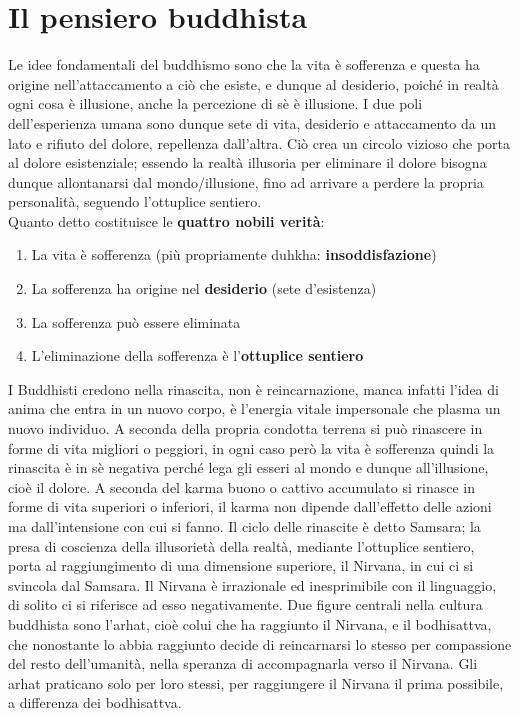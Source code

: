 \documentclass[10pt,a4paper]{report}
\begin{document}
\section{Il pensiero buddhista}
Le idee fondamentali del buddhismo sono che la vita è sofferenza e questa ha origine nell'attaccamento a ciò che esiste, e dunque al desiderio, poiché in realtà ogni cosa è illusione, anche la percezione di sè è illusione. I due poli dell'esperienza umana sono dunque sete di vita, desiderio e attaccamento da un lato e rifiuto del dolore, repellenza dall'altra. Ciò crea un circolo vizioso che porta al dolore esistenziale; essendo la realtà illusoria per eliminare il dolore bisogna dunque allontanarsi dal mondo/illusione, fino ad arrivare a perdere la propria personalità, seguendo l'ottuplice sentiero.\\
Quanto detto costituisce le \textbf{quattro nobili verità}:
\begin{enumerate}
	\item La vita è sofferenza (più propriamente duhkha: \textbf{insoddisfazione})
	\item La sofferenza ha origine nel \textbf{desiderio} (sete d'esistenza)
	\item La sofferenza può essere eliminata
	\item L'eliminazione della sofferenza è l'\textbf{ottuplice sentiero}
\end{enumerate}
I Buddhisti credono nella rinascita, non è reincarnazione, manca infatti l'idea di anima che entra in un nuovo corpo, è l'energia vitale impersonale che plasma un nuovo individuo. A seconda della propria condotta terrena si può rinascere in forme di vita migliori o peggiori, in ogni caso però la vita è sofferenza quindi la rinascita è in sè negativa perché lega gli esseri al mondo e dunque all'illusione, cioè il dolore. A seconda del karma buono o cattivo accumulato si rinasce in forme di vita superiori o inferiori, il karma non dipende dall'effetto delle azioni ma dall'intensione con cui si fanno. Il ciclo delle rinascite è detto Samsara; la presa di coscienza della illusorietà della realtà, mediante l'ottuplice sentiero, porta al raggiungimento di una dimensione superiore, il Nirvana, in cui ci si svincola dal Samsara. Il Nirvana è irrazionale ed inesprimibile con il linguaggio, di solito ci si riferisce ad esso negativamente. Due figure centrali nella cultura buddhista sono l'arhat, cioè colui che ha raggiunto il Nirvana, e il bodhisattva, che nonostante lo abbia raggiunto decide di reincarnarsi lo stesso per compassione del resto dell'umanità, nella speranza di accompagnarla verso il Nirvana. Gli arhat praticano solo per loro stessi, per raggiungere il Nirvana il prima possibile, a differenza dei bodhisattva.\\
\end{document}
